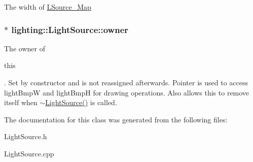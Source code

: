 The width of \hyperlink{classlighting_1_1LightSource_a11a9e08c80631c3019c2a59947c8458e}{L\+Source\+\_\+\+Map} 

\subsubsection[{\texorpdfstring{owner}{owner}}]{$\ast$ lighting\+::\+Light\+Source\+::owner\hspace{0.3cm}{\ttfamily [protected]}}\hypertarget{classlighting_1_1LightSource_ab991aac9d9ab3a1583f4acdc209055d5}{}\label{classlighting_1_1LightSource_ab991aac9d9ab3a1583f4acdc209055d5}


The owner of 
\begin{DoxyCode}
\textcolor{keyword}{this}
\end{DoxyCode}
. Set by constructor and is not reassigned afterwards. Pointer is used to access light\+BmpW and light\+BmpH for drawing operations. Also allows {\ttfamily this} to remove itself when \hyperlink{classlighting_1_1LightSource_a2165b5cf6099c6e5d2d6d242c1c8113e}{$\sim$\+Light\+Source()} is called. 



The documentation for this class was generated from the following files\+:\begin{DoxyCompactItemize}
\item 
Light\+Source.\+h\item 
Light\+Source.\+cpp\end{DoxyCompactItemize}
